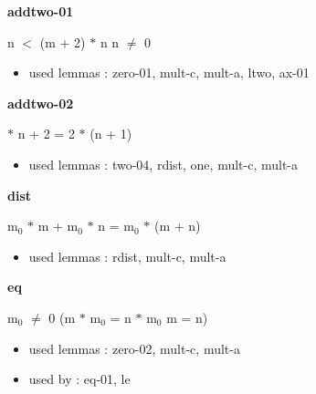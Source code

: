 \documentclass[a4paper]{article}
\begin{document}
\medskip

\bigskip

{\large\bf addtwo-01}

\medskip

 \Fol n $<$ (m + 2) $*$ n \Equiv n $\neq$ 0

\begin{itemize}


\item       used lemmas  : zero-01, mult-c, mult-a, ltwo, ax-01

\end{itemize}

\medskip

\bigskip

{\large\bf addtwo-02}

\medskip

  $*$ n + 2 = 2 $*$ (n + 1)

\begin{itemize}


\item       used lemmas  : two-04, rdist, one, mult-c, mult-a

\end{itemize}

\medskip

\bigskip

{\large\bf dist}

\medskip

 \Fol $\mbox{m}_{0}$ $*$ m + $\mbox{m}_{0}$ $*$ n = $\mbox{m}_{0}$ $*$ (m + n)

\begin{itemize}


\item       used lemmas  : rdist, mult-c, mult-a

\end{itemize}

\medskip

\bigskip

{\large\bf eq}

\medskip

 \Fol $\mbox{m}_{0}$ $\neq$ 0 \Imp (m $*$ $\mbox{m}_{0}$ = n $*$ $\mbox{m}_{0}$ \Equiv m = n)

\begin{itemize}


\item       used lemmas  : zero-02, mult-c, mult-a
\item       used by      : eq-01, le

\end{itemize}
\end{document}
